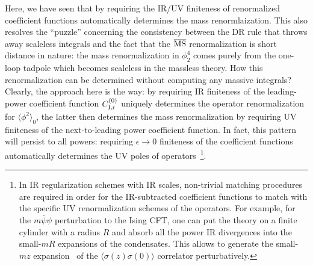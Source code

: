 \documentclass[a4paper,11pt]{article}
\begin{document}
Here, we have seen that by requiring the IR/UV finiteness of renormalized coefficient functions automatically determines the mass renormlaization. This also resolves the ``puzzle'' concerning the consistency between the DR rule that throws away scaleless integrals and the fact that the $\overline{\rm MS}$ renormalization is short distance in nature: the mass renormalization in $\phi_2^4$ comes purely from the one-loop tadpole which becomes scaleless in the massless theory. How this renormalization can be determined without computing any massive integrals? Clearly, the approach here is the way: by requiring IR finiteness of the leading-power coefficient function $C_{\rm I,r}^{(0)}$ uniquely determines the operator renormalization for $\langle\phi^2\rangle_0$, the latter then determines the mass renormalization by requiring UV finiteness of the next-to-leading power coefficient function. In fact, this pattern will persist to all powers: requiring $\epsilon\rightarrow0$ finiteness of the coefficient functions automatically determines the UV poles of operators~\footnote{In IR regularization schemes with IR scales, non-trivial matching procedures are required in order for the IR-subtracted coefficient functions to match with the specific UV renormalization schemes of the operators. For example, for the $m\bar\psi\psi$ perturbation to the Ising CFT, one can put the theory on a finite cylinder with a radius $R$ and absorb all the power IR divergences into the small-$mR$ expansions of the condensates. This allows to generate the small-$mz$ expansion~\cite{Wu:1975mw} of the $\langle\sigma(z)\sigma(0)\rangle$ correlator perturbatively.  }. 
\end{document}

